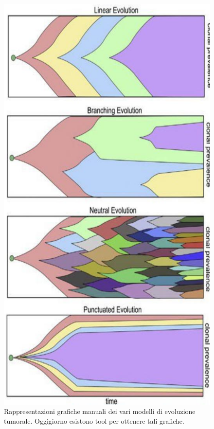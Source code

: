 \documentclass[a4paper,12pt, oneside]{book}
\begin{document}
\begin{figure}[H]
  \centering
  \includegraphics[scale = 0.25]{img/evolu.jpg}
  \caption{Rappresentazioni grafiche manuali dei vari modelli di evoluzione
    tumorale. Oggigiorno esistono tool per ottenere tali grafiche.} 
  \label{fig:evo}
\end{figure}
\end{document}
